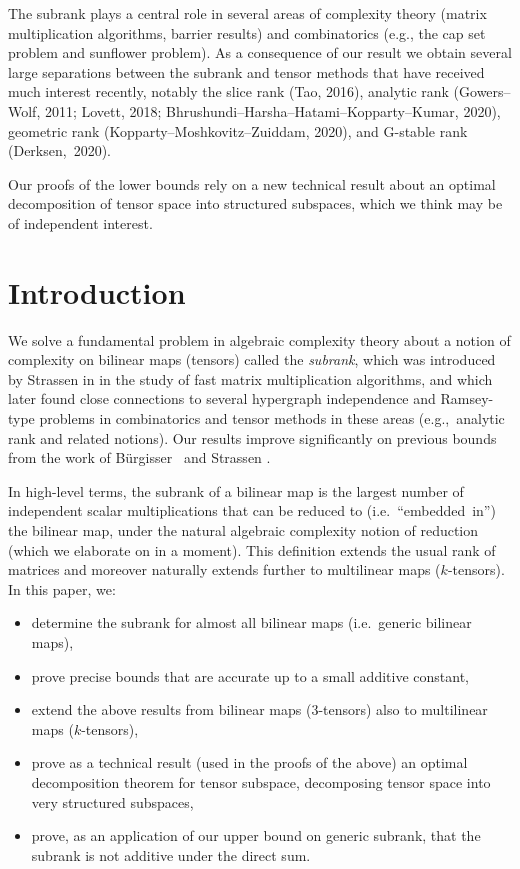 \documentclass[11pt]{article}
\theoremstyle{definition}
\theoremstyle{remark}
\begin{document}
The subrank plays a central role in several areas of complexity theory (matrix multiplication algorithms, barrier results) and combinatorics (e.g., the cap set problem and sunflower problem).
As a consequence of our result we obtain several large separations between the subrank and tensor methods that have received much interest recently, notably the slice rank (Tao, 2016), analytic rank (Gowers--Wolf, 2011; Lovett, 2018; Bhrushundi--Harsha--Hatami--Kopparty--Kumar, 2020), geometric rank (Kopparty--Moshkovitz--Zuiddam, 2020), and G-stable rank (Derksen,~2020).

Our proofs of the lower bounds rely on a new technical result about an optimal decomposition of tensor space into structured subspaces, which we think may be of independent interest. 

\thispagestyle{empty}
%
\newpage
\restoregeometry

\tableofcontents
%
\newpage

\section{Introduction}

We solve a fundamental problem in algebraic complexity theory about a notion of complexity on bilinear maps (tensors) called the \emph{subrank}, which was introduced by Strassen in \cite{strassen1987relative} in the study of fast matrix multiplication algorithms, and which later found close connections to several hypergraph independence and Ramsey-type problems in combinatorics and tensor methods in these areas (e.g.,~analytic rank \cite{lovett2019analytic,bhrushundi2018multilinear} and related notions). %
Our results improve significantly on previous bounds from the work of 
Bürgisser~\cite{burg} and Strassen \cite{strassen1991degeneration}.

In high-level terms, the subrank of a bilinear map is the largest number of independent scalar multiplications that can be reduced to (i.e.~``embedded~in'') the bilinear map, under the natural algebraic complexity notion of reduction (which we elaborate on in a moment). This definition extends the usual rank of matrices and moreover naturally extends further to multilinear maps ($k$-tensors).
In this paper, we:
\begin{itemize}
    \item determine the subrank for almost all bilinear maps (i.e.~generic bilinear maps),
    \item prove precise bounds that are accurate up to a small additive constant,
    \item extend the above results from bilinear maps ($3$-tensors) also to multilinear maps (\mbox{$k$-tensors}),
    \item prove as a technical result (used in the proofs of the above) an optimal decomposition theorem for tensor subspace, decomposing tensor space into very structured subspaces,
    \item prove, as an application of our upper bound on generic subrank, that the subrank is not additive under the direct sum.
\end{itemize} 
\end{document}
